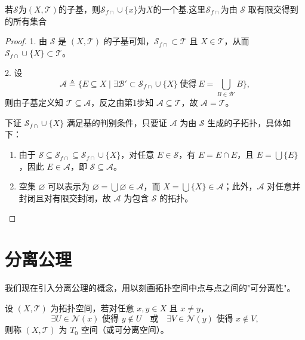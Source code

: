 \documentclass[lang=cn,a4paper,newtx,figureplace=section,tableplace=section]{elegantbook}
\begin{document}
\begin{proposition}
    若$\mathcal{S}$为$(X,\mathcal{T})$的子基，则$\mathcal{S}_{f\cap}\cup\{x\}$为$X$的一个基.这里$\mathcal{S}_{f\cap}$为由 $\mathcal{S}$ 取有限交得到的所有集合
\end{proposition}
\begin{proof}
    1. 由 $\mathcal{S}$ 是 $(X,\mathcal{T})$ 的子基可知，$\mathcal{S}_{f\cap} \subset \mathcal{T}$ 且 $X \in \mathcal{T}$，从而 $\mathcal{S}_{f\cap} \cup \{X\} \subset \mathcal{T}$。

2. 设
\[
\mathcal{A} \triangleq \{ E \subseteq X \mid \exists \mathcal{B}' \subset \mathcal{S}_{f\cap} \cup \{X\} \ \text{使得}\ E = \bigcup_{B \in \mathcal{B}'} B \},
\]
则由子基定义知 $\mathcal{T} \subseteq \mathcal{A}$，反之由第1步知 $\mathcal{A} \subseteq \mathcal{T}$，故 $\mathcal{A} = \mathcal{T}$。

下证 $\mathcal{S}_{f\cap} \cup \{X\}$ 满足基的判别条件，只要证 $\mathcal{A}$ 为由 $\mathcal{S}$ 生成的子拓扑，具体如下：
\begin{enumerate}
    \item 由于 $\mathcal{S} \subseteq \mathcal{S}_{f\cap} \subseteq \mathcal{S}_{f\cap} \cup \{X\}$，对任意 $E \in \mathcal{S}$，有 $E = E \cap E$，且 $E = \bigcup\{E\}$，因此 $E \in \mathcal{A}$，即 $\mathcal{S} \subseteq \mathcal{A}$。
    \item 空集 $\varnothing$ 可以表示为 $\varnothing = \bigcup \varnothing \in \mathcal{A}$，而 $X = \bigcup\{X\} \in \mathcal{A}$；此外，$\mathcal{A}$ 对任意并封闭且对有限交封闭，故 $\mathcal{A}$ 为包含 $\mathcal{S}$ 的拓扑。
\end{enumerate}
\end{proof}

\chapter{分离公理}

我们现在引入分离公理的概念，用以刻画拓扑空间中点与点之间的"可分离性"。

\begin{definition}[$T_0$ 空间（可分离空间）]\label{def:T0}
设 $(X,\mathcal{T})$ 为拓扑空间，若对任意 $x, y \in X$ 且 $x \neq y$，
\begin{equation}
\exists U \in \mathcal{N}(x) \text{ 使得 } y \notin U \quad \text{或} \quad \exists V \in \mathcal{N}(y) \text{ 使得 } x \notin V,
\end{equation}
则称 $(X,\mathcal{T})$ 为 $T_0$ 空间（或可分离空间）。
\end{definition}
\end{document}
